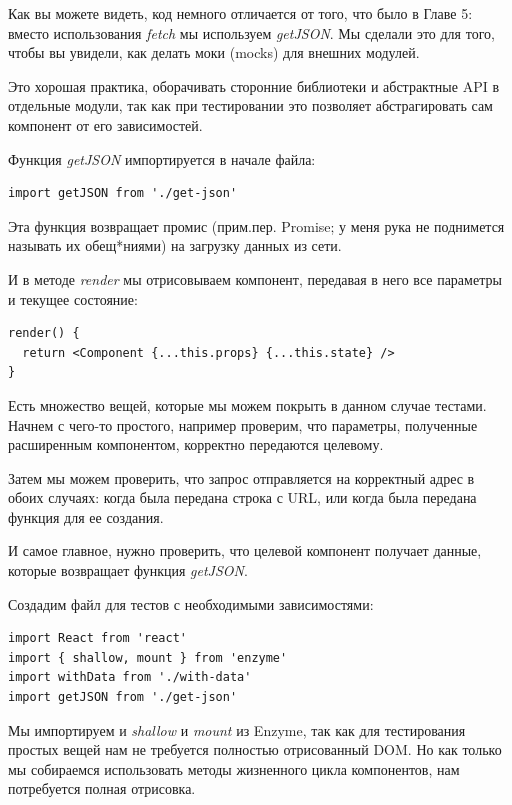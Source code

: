 Как вы можете видеть, код немного отличается от того, что было в Главе 5: вместо использования \textit{fetch} мы используем \textit{getJSON}. Мы сделали это для того, чтобы вы увидели, как делать моки (mocks) для внешних модулей.

Это хорошая практика, оборачивать сторонние библиотеки и абстрактные API в отдельные модули, так как при тестировании это позволяет абстрагировать сам компонент от его зависимостей.

Функция \textit{getJSON} импортируется в начале файла:

\begin{lstlisting}
import getJSON from './get-json'
\end{lstlisting}

Эта функция возвращает промис (прим.пер. Promise; у меня рука не поднимется называть их обещ*ниями) на загрузку данных из сети.

И в методе \textit{render} мы отрисовываем компонент, передавая в него все параметры и текущее состояние:

\begin{lstlisting}
render() {
  return <Component {...this.props} {...this.state} />
}
\end{lstlisting}

Есть множество вещей, которые мы можем покрыть в данном случае тестами. Начнем с чего-то простого, например проверим, что параметры, полученные расширенным компонентом, корректно передаются целевому.

Затем мы можем проверить, что запрос отправляется на корректный адрес в обоих случаях: когда была передана строка с URL, или когда была передана функция для ее создания.

И самое главное, нужно проверить, что целевой компонент получает данные, которые возвращает функция \textit{getJSON}.

Создадим файл для тестов с необходимыми зависимостями:

\begin{lstlisting}
import React from 'react'
import { shallow, mount } from 'enzyme'
import withData from './with-data'
import getJSON from './get-json'
\end{lstlisting}

Мы импортируем и \textit{shallow} и \textit{mount} из Enzyme, так как для тестирования простых вещей нам не требуется полностью отрисованный DOM. Но как только мы собираемся использовать методы жизненного цикла компонентов, нам потребуется полная отрисовка.

